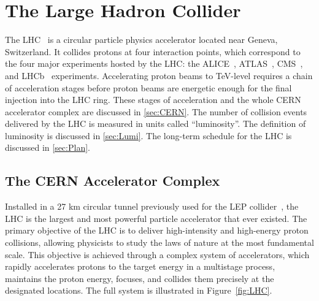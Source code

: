 \chapter{The Large Hadron Collider}
\label{chap:LHC}

The \ac{LHC}~\cite{Evans:2008zzb} is a circular particle physics accelerator located near Geneva, Switzerland. It collides protons at four interaction points, which correspond to the four major experiments hosted by the \ac{LHC}: the \ac{ALICE}~\cite{ALICE:2008ngc}, \ac{ATLAS}~\cite{ATLAS:2008xda}, \ac{CMS}~\cite{CMS:2008xjf}, and \ac{LHCb}~\cite{LHCb:2008vvz} experiments. Accelerating proton beams to TeV-level requires a chain of acceleration stages before proton beams are energetic enough for the final injection into the \ac{LHC} ring. These stages of acceleration and the whole \ac{CERN} accelerator complex are discussed in \autoref{sec:CERN}. The number of collision events delivered by the \ac{LHC} is measured in units called ``luminosity''. The definition of luminosity is discussed in \autoref{sec:Lumi}. The long-term schedule for the \ac{LHC} is discussed in \autoref{sec:Plan}.

\section{The CERN Accelerator Complex}
\label{sec:CERN}

Installed in a 27 km circular tunnel previously used for the \ac{LEP} collider~\cite{203828}, the \ac{LHC} is the largest and most powerful particle accelerator that ever existed. The primary objective of the \ac{LHC} is to deliver high-intensity and high-energy proton collisions, allowing physicists to study the laws of nature at the most fundamental scale. This objective is achieved through a complex system of accelerators, which rapidly accelerates protons to the target energy in a multistage process, maintains the proton energy, focuses, and collides them precisely at the designated locations. The full system is illustrated in Figure~\ref{fig:LHC}.

